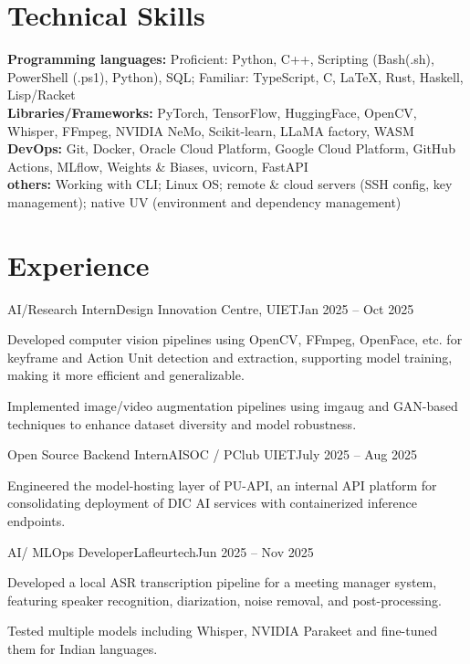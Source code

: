 \documentclass[10pt, letterpaper]{article}
\newcommand{\skillsentry}[2]{\textbf{#1:} {\RaggedRight #2}}
\newenvironment{compactskills}{%
    \begingroup\small\RaggedRight\setlength{\parskip}{2pt}\setlength{\parindent}{0pt}%
    \hyphenpenalty=500 \exhyphenpenalty=500 \sloppy%
}{\par\endgroup}
\begin{document}
\section{Technical Skills}
\begin{compactskills}
\skillsentry{Programming languages}{Proficient: Python, C++, Scripting (Bash(.sh), PowerShell (.ps1), Python), SQL; Familiar: TypeScript, C, LaTeX, Rust, Haskell, Lisp/Racket}\\
\skillsentry{Libraries/Frameworks}{PyTorch, TensorFlow, HuggingFace, OpenCV, Whisper, FFmpeg, NVIDIA NeMo, Scikit-learn, LLaMA factory, WASM}\\
\skillsentry{DevOps}{Git, Docker, Oracle Cloud Platform, Google Cloud Platform, GitHub Actions, MLflow, Weights \& Biases, uvicorn, FastAPI}\\
\skillsentry{others}{Working with CLI; Linux OS; remote \& cloud servers (SSH config, key management); native UV (environment and dependency management)}\\
\end{compactskills}


\section{Experience}

\begin{experienceentry}{AI/Research Intern}{Design Innovation Centre, UIET}{Jan 2025 -- Oct 2025}
    \item Developed computer vision pipelines using OpenCV, FFmpeg, OpenFace, etc. for keyframe and Action Unit detection and extraction, supporting model training, making it more efficient and generalizable.
    \item Implemented image/video augmentation pipelines using imgaug and GAN-based techniques to enhance dataset diversity and model robustness.
    \begin{subexperienceentry}{Open Source Backend Intern}{AISOC / PClub UIET}{July 2025 -- Aug 2025}
        \item Engineered the model-hosting layer of PU-API, an internal API platform for consolidating deployment of DIC AI services with containerized inference endpoints.
    \end{subexperienceentry}
\end{experienceentry}

\begin{experienceentry}{AI/ MLOps Developer}{Lafleurtech}{Jun 2025 -- Nov 2025}
    \item Developed a local ASR transcription pipeline for a meeting manager system, featuring speaker recognition, diarization, noise removal, and post-processing.
    \item Tested multiple models including Whisper, NVIDIA Parakeet and fine-tuned them for Indian languages.
\end{experienceentry}
\end{document}
